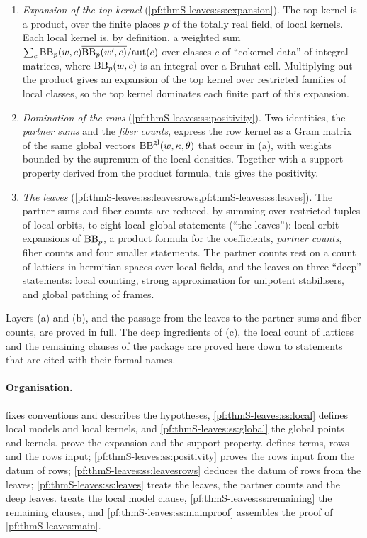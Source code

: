 \begin{enumerate}[label=(\alph*)]
\item \emph{Expansion of the top kernel} (\cref{pf:thmS-leaves:ss:expansion}). The top kernel is a product,
over the finite places $p$ of the totally real field, of local kernels. Each local kernel is, by definition,
a weighted sum $\sum_c \mathrm{BB}_p(w,c)\overline{\mathrm{BB}_p(w',c)}/\mathrm{aut}(c)$ over classes $c$ of
``cokernel data'' of integral matrices, where $\mathrm{BB}_p(w,c)$ is an integral over a Bruhat cell. Multiplying
out the product gives an expansion of the top kernel over restricted families of local classes, so the top
kernel dominates each finite part of this expansion.
\item \emph{Domination of the rows} (\cref{pf:thmS-leaves:ss:positivity}). Two identities, the \emph{partner sums}
and the \emph{fiber counts}, express the row kernel as a Gram matrix of the same global vectors
$\mathrm{BB}^{\mathrm{gl}}(w,\kappa,\theta)$ that occur in (a), with weights bounded by the supremum of the local densities.
Together with a support property derived from the product formula, this gives the positivity.
\item \emph{The leaves} (\cref{pf:thmS-leaves:ss:leavesrows,pf:thmS-leaves:ss:leaves}). The partner sums and fiber
counts are reduced, by summing over restricted tuples of local orbits, to eight local--global statements
(``the leaves''): local orbit expansions of $\mathrm{BB}_p$, a product formula for the coefficients, \emph{partner
counts}, fiber counts and four smaller statements. The partner counts rest on a count of lattices in hermitian
spaces over local fields, and the leaves on three ``deep'' statements: local counting, strong approximation for
unipotent stabilisers, and global patching of frames.
\end{enumerate}

Layers (a) and (b), and the passage from the leaves to the partner sums and fiber counts, are proved in full.
The deep ingredients of (c), the local count of lattices and the remaining clauses of the package are proved here
down to statements that are cited with their formal names.

\paragraph{Organisation.}  fixes conventions and describes the hypotheses,
\cref{pf:thmS-leaves:ss:local} defines local models and local kernels, and \cref{pf:thmS-leaves:ss:global} the global
points and kernels.  prove the expansion and the support
property.  defines terms, rows and the rows input; \cref{pf:thmS-leaves:ss:positivity}
proves the rows input from the datum of rows; \cref{pf:thmS-leaves:ss:leavesrows} deduces the datum of rows from the
leaves; \cref{pf:thmS-leaves:ss:leaves} treats the leaves, the partner counts and the deep leaves.
 treats the local model clause, \cref{pf:thmS-leaves:ss:remaining} the remaining
clauses, and \cref{pf:thmS-leaves:ss:mainproof} assembles the proof of \cref{pf:thmS-leaves:main}.

